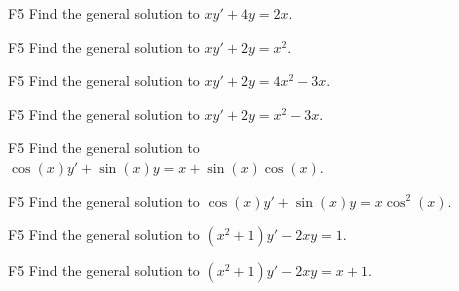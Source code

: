 \begin{problem}{F5}
Find the general solution to \(xy' + 4y = 2x\).
\end{problem}

\begin{problem}{F5}
Find the general solution to \(xy' + 2y = x^2\).
\end{problem}

\begin{problem}{F5}
Find the general solution to \(xy' + 2y = 4x^2-3x\).
\end{problem}

\begin{problem}{F5}
Find the general solution to \(xy' + 2y = x^2-3x\).
\end{problem}

\begin{problem}{F5}
Find the general solution to \(\cos(x) y' + \sin (x)y = x +\sin(x)\cos(x) \).
\end{problem}

\begin{problem}{F5}
Find the general solution to \(\cos(x) y' + \sin (x)y = x \cos^2(x) \).
\end{problem}

\begin{problem}{F5}
Find the general solution to \((x^2+1)y' - 2xy =1 \).
\end{problem}

\begin{problem}{F5}
Find the general solution to \((x^2+1)y' - 2xy =x+1 \).
\end{problem}
